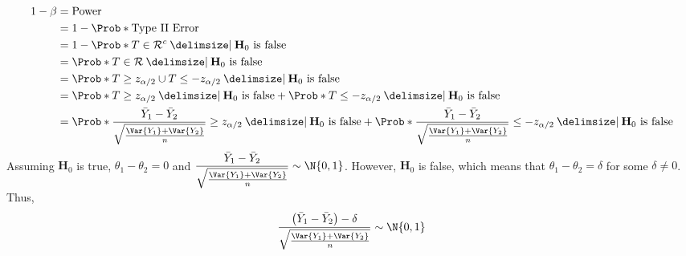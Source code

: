\begin{align*}
    1-\beta
     & =\text{Power}                                                                                                                                                                                                                                                     \\
     & =1-\Prob*{\text{Type II Error}}                                                                                                                                                                                                                                   \\
     & =1-\Prob*{T\in\mathcal{R}^c\given \text{$ \mathbf{H}_0 $ is false}}                                                                                                                                                                                               \\
     & =\Prob*{T\in\mathcal{R}\given \text{$ \mathbf{H}_0 $ is false}}                                                                                                                                                                                                   \\
     & =\Prob*{T\ge z_{\alpha/2}\cup T\le -z_{\alpha/2}\given \text{$ \mathbf{H}_0 $ is false}}                                                                                                                                                                          \\
     & =\Prob*{T\ge z_{\alpha/2}\given \text{$ \mathbf{H}_0 $ is false}}+\Prob*{T\le -z_{\alpha/2}\given \text{$ \mathbf{H}_0 $ is false}}                                                                                                                               \\
     & =\Prob*{\frac{\bar{Y}_1-\bar{Y}_2}{\sqrt{\frac{\Var{Y_1}+\Var{Y_2}}{n}}}\ge z_{\alpha/2}\given \text{$ \mathbf{H}_0 $ is false}}+\Prob*{\frac{\bar{Y}_1-\bar{Y}_2}{\sqrt{\frac{\Var{Y_1}+\Var{Y_2}}{n}}}\le -z_{\alpha/2}\given \text{$ \mathbf{H}_0 $ is false}}
\end{align*}
Assuming $ \mathbf{H}_0 $ is true, $ \theta_1-\theta_2=0 $ and $ \displaystyle \frac{\bar{Y}_1-\bar{Y}_2}{\sqrt{\frac{\Var{Y_1}+\Var{Y_2}}{n}}} \sim \N{0,1} $.
However, $ \mathbf{H}_0 $ is false, which means that $ \theta_1-\theta_2=\delta $ for some $ \delta\ne 0 $. Thus,
\[ \frac{\bigl(\bar{Y}_1-\bar{Y}_2\bigr)-\delta}{\sqrt{\frac{\Var{Y_1}+\Var{Y_2}}{n}}}\sim \N{0,1}  \]
